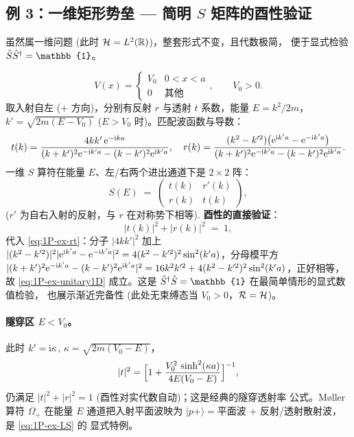 \subsection{例 3：一维矩形势垒 — 简明 $S$ 矩阵的酉性验证}
\label{ssec:1P-ex-rect}

虽然属一维问题 (此时 $\mathcal{H}=L^2(\mathbb{R})$)，整套形式不变，且代数极简，
便于显式检验 $\Smat\Smat^\dagger=\mathbb{1}$。

\begin{equation}
  V(x) = \begin{cases} V_0 & 0<x<a\\ 0 & \text{其他} \end{cases},\qquad V_0>0.
  \label{eq:1P-ex-rect}
\end{equation}
取入射自左 ($+$ 方向)，分别有反射 $r$ 与透射 $t$ 系数，能量 $E=k^2/2m$，
$k'=\sqrt{2m(E-V_0)}$ ($E>V_0$ 时)。匹配波函数与导数：
\begin{equation}
  t(k) = \frac{4kk'\,\mathrm{e}^{-\mathrm{i} ka}}
              {(k+k')^2\mathrm{e}^{-\mathrm{i} k'a} - (k-k')^2\mathrm{e}^{\mathrm{i} k'a}},\quad
  r(k) = \frac{(k^2-k'^2)\bigl(\mathrm{e}^{\mathrm{i} k'a}-\mathrm{e}^{-\mathrm{i} k'a}\bigr)}
              {(k+k')^2\mathrm{e}^{-\mathrm{i} k'a} - (k-k')^2\mathrm{e}^{\mathrm{i} k'a}}.
  \label{eq:1P-ex-rt}
\end{equation}
一维 $S$ 算符在能量 $E$、左/右两个进出通道下是 $2\times 2$ 阵：
\begin{equation}
  S(E) \;=\; \begin{pmatrix} t(k) & r'(k) \\ r(k) & t(k) \end{pmatrix},
  \label{eq:1P-ex-Smatrix1D}
\end{equation}
($r'$ 为自右入射的反射，与 $r$ 在对称势下相等).
\textbf{酉性的直接验证}：
\begin{equation}
  |t(k)|^2 + |r(k)|^2 \;=\; 1,
  \label{eq:1P-ex-unitary1D}
\end{equation}
代入 \eqref{eq:1P-ex-rt}：分子 $|4kk'|^2$ 加上
$|(k^2-k'^2)|^2|\mathrm{e}^{\mathrm{i} k'a}-\mathrm{e}^{-\mathrm{i} k'a}|^2
=4(k^2-k'^2)^2\sin^2(k'a)$，分母模平方
$|(k+k')^2\mathrm{e}^{-\mathrm{i} k'a}-(k-k')^2\mathrm{e}^{\mathrm{i} k'a}|^2
= 16k^2k'^2 + 4(k^2-k'^2)^2\sin^2(k'a)$，正好相等，故
\eqref{eq:1P-ex-unitary1D} 成立。这是
$\Smat^\dagger\Smat=\mathbb{1}$ 在最简单情形的显式数值检验，
也展示渐近完备性 (此处无束缚态当 $V_0>0$，$\mathcal{R}=\mathcal{H}$)。

\paragraph{隧穿区 $E<V_0$。}
此时 $k'=\mathrm{i}\kappa$, $\kappa=\sqrt{2m(V_0-E)}$，
\begin{equation}
  |t|^2 = \Bigl[1 + \frac{V_0^2\,\sinh^2(\kappa a)}{4E(V_0-E)}\Bigr]^{-1},
  \label{eq:1P-ex-tunnel}
\end{equation}
仍满足 $|t|^2+|r|^2=1$ (酉性对实代数自动)；这是经典的隧穿透射率
公式。Møller 算符 $\Omega_+$ 在能量 $E$ 通道把入射平面波映为
$|p+\rangle = $平面波 + 反射/透射散射波，是 \eqref{eq:1P-ex-LS} 的
显式特例。

